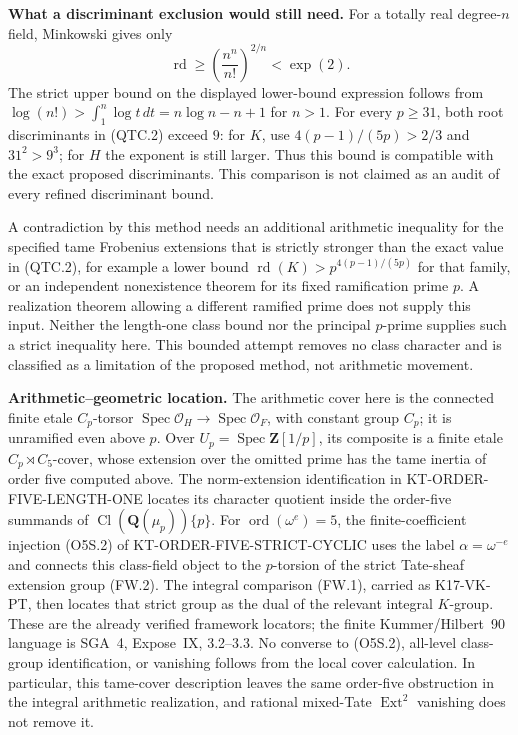\documentclass[11pt,a4paper]{article}
\theoremstyle{definition}
\renewcommand{\paragraph}[1]{\par\smallskip\noindent\textbf{#1}\quad\ignorespaces}
\begin{document}
\paragraph{What a discriminant exclusion would still need.}
For a totally real degree-$n$ field, Minkowski gives only
\[
 \operatorname{rd}\ge
       \left(\frac{n^n}{n!}\right)^{2/n}<\exp(2).      \tag{QTC.6}
\]
The strict upper bound on the displayed lower-bound expression follows
from $\log(n!)>\int_1^n\log t\,dt=n\log n-n+1$ for $n>1$.
For every $p\ge31$, both root discriminants in (QTC.2) exceed $9$:
for $K$, use $4(p-1)/(5p)>2/3$ and $31^2>9^3$; for $H$
the exponent is still larger.  Thus this bound is compatible with
the exact proposed discriminants.  This comparison is not claimed
as an audit of every refined discriminant bound.

A contradiction by this method needs an additional arithmetic
inequality for the specified tame Frobenius extensions that is
strictly stronger than the exact value in (QTC.2), for example a
lower bound $\operatorname{rd}(K)>p^{4(p-1)/(5p)}$ for that family,
or an independent nonexistence theorem for its fixed ramification
prime $p$.  A realization theorem allowing a different ramified prime
does not supply this input.  Neither the length-one class bound nor
the principal $p$-prime supplies such a strict inequality here.
This bounded attempt removes no class character and is classified
as a limitation of the proposed method, not arithmetic movement.

\paragraph{Arithmetic--geometric location.}
The arithmetic cover here is the connected finite etale $C_p$-torsor
$\operatorname{Spec}\mathcal O_H\to\operatorname{Spec}\mathcal O_F$,
with constant group $C_p$; it is unramified even above $p$.
Over $U_p=\operatorname{Spec}\mathbf Z[1/p]$, its composite is a
finite etale $C_p\rtimes C_5$-cover, whose extension over the omitted
prime has the tame inertia of order five computed above.
The norm-extension identification in KT-ORDER-FIVE-LENGTH-ONE
locates its character quotient inside the order-five summands of
$\operatorname{Cl}(\mathbf Q(\mu_p))\{p\}$.
For $\operatorname{ord}(\omega^e)=5$, the finite-coefficient injection
(O5S.2) of KT-ORDER-FIVE-STRICT-CYCLIC uses the label
$\alpha=\omega^{-e}$ and connects this class-field object to the
$p$-torsion of the strict Tate-sheaf extension group (FW.2).
The integral comparison (FW.1), carried as K17-VK-PT, then locates
that strict group as the dual of the relevant integral $K$-group.
These are the already verified framework locators; the finite
Kummer/Hilbert~90 language is SGA~4, Expose~IX, 3.2--3.3.
No converse to (O5S.2), all-level class-group identification, or
vanishing follows from the local cover calculation.  In particular,
this tame-cover description leaves the same order-five obstruction
in the integral arithmetic realization, and rational mixed-Tate
$\operatorname{Ext}^2$ vanishing does not remove it.
\end{document}
